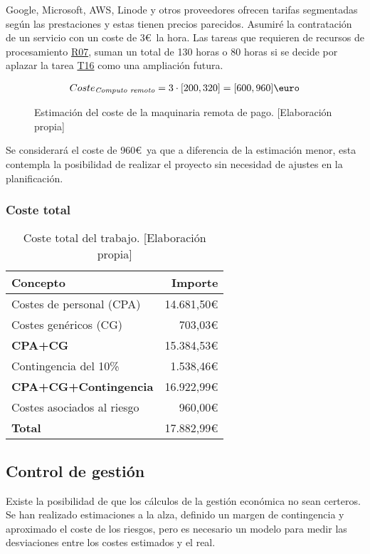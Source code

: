 Google, Microsoft, AWS, Linode y otros proveedores ofrecen tarifas segmentadas según
las prestaciones y estas tienen precios parecidos. Asumiré la contratación de un servicio con un coste de 3\euro\ la hora.
Las tareas que requieren de recursos de procesamiento \hyperref[R07]{R07}, suman un total de
130 horas o 80 horas si se decide por aplazar la tarea \hyperref[T16]{T16} como una ampliación futura.
\begin{figure}[H]
    \begin{align*}
        Coste_{\textit{Computo remoto}} = 3 \cdot [200, 320] = [600, 960]\text{\euro}
    \end{align*}
    \caption{Estimación del coste de la maquinaria remota de pago.  [Elaboración propia]}
\end{figure}
Se considerará el coste de 960\euro\ ya que a diferencia de la estimación menor, esta contempla la posibilidad de
realizar el proyecto sin necesidad de ajustes en la planificación.


\begin{table}[H]
    \subsubsection{Coste total}
    \begin{center}
        \begin{tabular}{ l r }
         Concepto & Importe \\
         \hline
         Costes de personal (CPA) & 14.681,50\euro \\
         Costes genéricos (CG) & 703,03\euro \\
         \textbf{CPA+CG} & 15.384,53\euro \\
         Contingencia del 10\% & 1.538,46\euro \\
         \textbf{CPA+CG+Contingencia} & 16.922,99\euro \\
         Costes asociados al riesgo & 960,00\euro \\ 
         \hline \hline
         \textbf{Total} & 17.882,99\euro
        \end{tabular}
        \caption{Coste total del trabajo. [Elaboración propia]}\label{totalcosttable}
    \end{center}
\end{table}

\subsection{Control de gestión}\label{controlgestioneco}
Existe la posibilidad de que los cálculos de la gestión económica no sean certeros.
Se han realizado estimaciones a la alza, definido un margen de contingencia y aproximado el coste de los riesgos,
pero es necesario un modelo para medir las desviaciones entre los costes estimados y el real.

